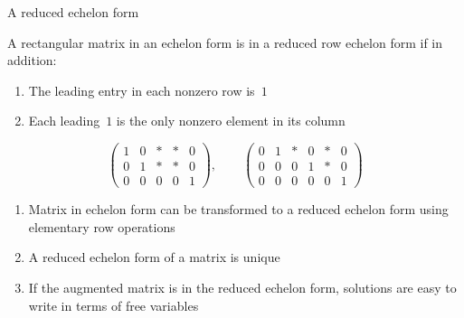 \documentclass%
[handout]%
{beamer}
\begin{document}
\begin{frame}[label=reduced-echelon]{A reduced echelon form}

  \vspace*{-10pt}

  \begin{definition}
    A rectangular matrix in an echelon form is in a \alert{reduced row echelon form} if in addition:
    \begin{enumerate}
      \item The leading entry in each nonzero row is~$1$
      \item Each leading~$1$ is the only nonzero element in its column
    \end{enumerate}
  \end{definition}

  \vspace*{-8pt}

  \begin{example}
  \[
    \begin{pmatrix}
      1     & 0    & \ast  & \ast  & 0 \\
      0       & 1 & \ast  & \ast  & 0 \\
      0       &     0   &   0   &   0   & 1
    \end{pmatrix},
    \qquad
    \begin{pmatrix}
      0       &   1     & \ast  & 0    & \ast  & 0\\
      0       &   0     & 0     & 1   & \ast  & 0  \\
      0       &     0   &   0   &   0       & 0     & 1
    \end{pmatrix}
  \]
  \end{example}

  \vspace*{-8pt}

 \begin{block}{}
   \begin{enumerate}
     \item Matrix in echelon form can be transformed to a reduced echelon form using elementary row operations
     \item A reduced echelon form of a matrix is \alert{unique}
     \item If the augmented matrix is in the reduced echelon form, solutions are easy to write in terms of free variables
   \end{enumerate}
 \end{block}

\end{frame}
\end{document}
